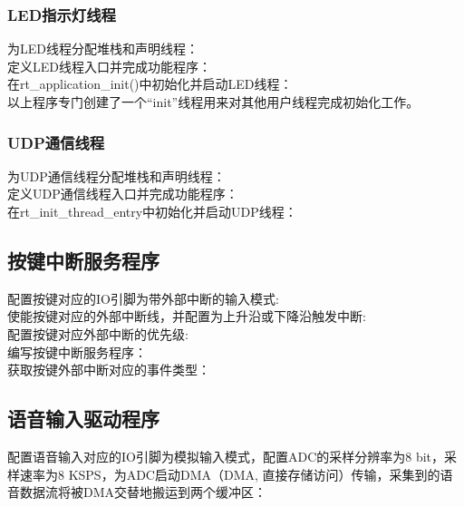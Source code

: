 \subsubsection{LED指示灯线程}
为LED线程分配堆栈和声明线程：\\


定义LED线程入口并完成功能程序：\\


在rt{\_}application{\_}init()中初始化并启动LED线程：\\

以上程序专门创建了一个“init”线程用来对其他用户线程完成初始化工作。

\subsubsection{UDP通信线程}
为UDP通信线程分配堆栈和声明线程：\\


定义UDP通信线程入口并完成功能程序：\\


在rt{\_}init{\_}thread{\_}entry{}中初始化并启动UDP线程：\\


\subsection{按键中断服务程序}
配置按键对应的IO引脚为带外部中断的输入模式:\\


使能按键对应的外部中断线，并配置为上升沿或下降沿触发中断:\\


配置按键对应外部中断的优先级:\\


编写按键中断服务程序：\\


获取按键外部中断对应的事件类型：\\


\subsection{语音输入驱动程序}
配置语音输入对应的IO引脚为模拟输入模式，配置\acrshort{ADC}的采样分辨率为8 bit，采样速率为8 KSPS，为\acrshort{ADC}启动DMA（\acrlong{DMA}, 直接存储访问）传输，采集到的语音数据流将被\acrshort{DMA}交替地搬运到两个缓冲区：\\


